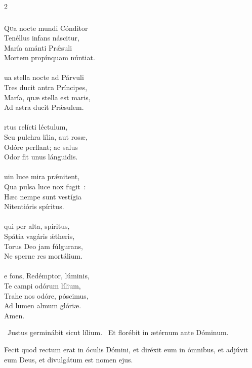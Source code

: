 \documentclass[9pt,twoside]{extarticle}
\begin{document}
\begin{multicols}{2}
{{{\subsubsection*{\center {}}
\begin{center}\end{center}
\lettrine{Q}ua nocte mundi Cónditor\\
Tenéllus infans náscitur,\\
María amánti Prǽsuli\\
Mortem propínquam núntiat.\\
\\
ua stella nocte ad Párvuli\\
Tres ducit antra Príncipes,\\
María, quæ stella est maris,\\
Ad astra ducit Prǽsulem.\\
\\
rtus relícti léctulum,\\
Seu pulchra lília, aut rosæ,\\
Odóre perflant; ac salus\\
Odor fit unus lánguidis.\\
\\
uin luce mira prǽnitent,\\
Qua pulsa luce nox fugit~:\\
Hæc nempe sunt vestígia\\
Nitentióris spíritus.\\
\\
 qui per alta, spíritus,\\
Spátia vagáris ǽtheris,\\
Torus Deo jam fúlgurans,\\
Ne sperne res mortálium.\\
\\
e fons, Redémptor, lúminis,\\
Te campi odórum lílium,\\
Trahe nos odóre, póscimus,\\
Ad lumen almum glóriæ.\\
Amen.

\begin{tightlist}{}
\item {}~Justus germinábit sicut lílium. ~Et florébit in ætérnum ante Dóminum.
\item {} Fecit quod rectum erat in óculis Dómini, et diréxit eum in ómnibus, et adjúvit eum Deus, et divulgátum est nomen ejus.
\end{tightlist}

}}}
\end{multicols}
\end{document}
